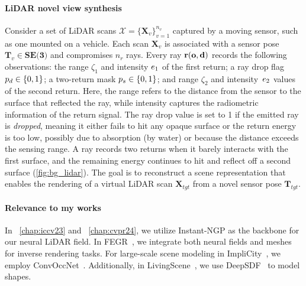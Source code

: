 \paragraph{LiDAR novel view synthesis}
Consider a set of LiDAR scans $\mathcal{X} = \{\mathbf{X}_v\}_{v=1}^{n_v}$ captured by a moving sensor, such as one mounted on a vehicle. Each scan $\mathbf{X}_v$ is associated with a sensor pose $\mathbf{T}_v \in \textbf{SE(3)}$ and compromises $n_r$ rays. Every ray $\mathbf{r}(\mathbf{o}, \mathbf{d})$ records the following observations: the range $\zeta_1$ and intensity $e_1$ of the first return; a ray drop flag $p_d \in \{0, 1\}$; a two-return mask $p_s \in \{0,1\}$; and range $\zeta_2$ and intensity~$e_2$ values of the second return. Here, the range refers to the distance from the sensor to the surface that reflected the ray, while intensity captures the radiometric information of the return signal. The ray drop value is set to 1 if the emitted ray is \textit{dropped}, meaning it either fails to hit any opaque surface or the return energy is too low, possibly due to absorption (\eg by water) or because the distance exceeds the sensing range. A ray records two returns when it barely interacts with the first surface, and the remaining energy continues to hit and reflect off a second surface (\cref{fig:bg_lidar}). The goal is to reconstruct a scene representation that enables the rendering of a virtual LiDAR scan $\mathbf{X}_{tgt}$ from a novel sensor pose $\mathbf{T}_{tgt}$.

\paragraph{Relevance to my works} In ~\cref{chap:iccv23} and ~\cref{chap:cvpr24}, we utilize Instant-NGP as the backbone for our neural LiDAR field. In FEGR~\cite{wang2023neural}, we integrate both neural fields and meshes for inverse rendering tasks. For large-scale scene modeling in ImpliCity~\cite{stucker2022implicity}, we employ ConvOccNet~\cite{peng2020convolutional}. Additionally, in LivingScene~\cite{zhu2023living}, we use DeepSDF~\cite{park2019deepsdf} to model shapes.